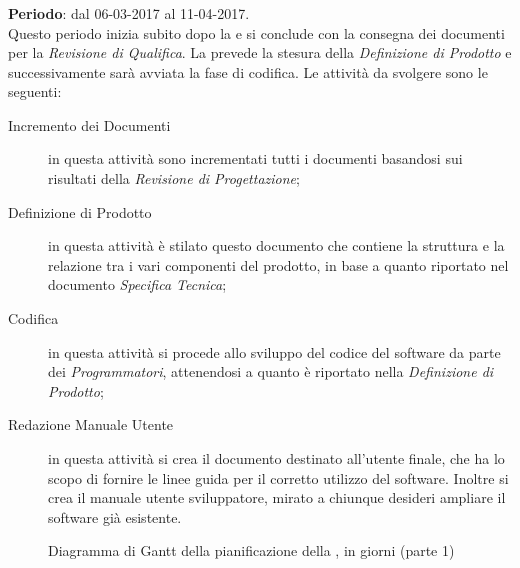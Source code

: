 	\subsubsection{\PDC} \label{sec:PDC}
	\textbf{Periodo}: dal 06-03-2017 al 11-04-2017.	
	\\ Questo periodo inizia subito dopo la \PA{} e si conclude con la consegna dei documenti per la \emph{Revisione di Qualifica}. La \PDC{} prevede la stesura della \emph{Definizione di Prodotto} e successivamente sarà avviata la fase di codifica. Le attività da svolgere sono le seguenti:
	\begin{description}
		\item[Incremento dei Documenti] in questa attività sono incrementati tutti i documenti basandosi sui risultati della \emph{Revisione di Progettazione}; 
		\item[Definizione di Prodotto] in questa attività è stilato questo documento che contiene la struttura e la relazione tra i vari componenti del prodotto, in base a quanto riportato nel documento \emph{Specifica Tecnica};
		\item[Codifica] in questa attività si procede allo sviluppo del codice del software da parte dei \emph{Programmatori}, attenendosi a quanto è riportato nella \emph{Definizione di Prodotto}; 
		\item[Redazione Manuale Utente] in questa attività si crea il documento destinato all'utente finale, che ha lo scopo di fornire le linee guida per il corretto utilizzo del software. Inoltre si crea il manuale utente sviluppatore, mirato a chiunque desideri ampliare il software già esistente.
	\end{description}
	
\begin{figure}[H]
\label{tab:ganttpa1}
\caption{Diagramma di Gantt della pianificazione della \PDC, in giorni (parte 1)}
\end{figure}

